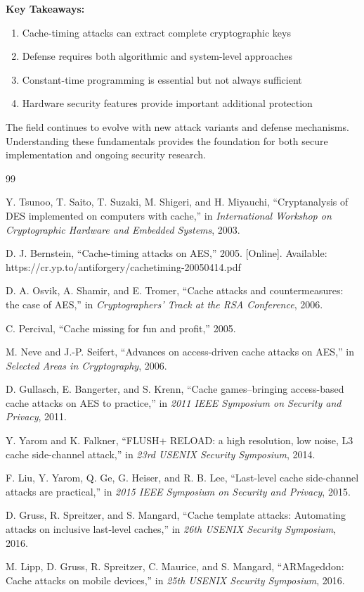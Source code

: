 \documentclass[11pt,a4paper]{article}
\theoremstyle{definition}
\begin{document}
\textbf{Key Takeaways:}
\begin{enumerate}
    \item Cache-timing attacks can extract complete cryptographic keys
    \item Defense requires both algorithmic and system-level approaches
    \item Constant-time programming is essential but not always sufficient
    \item Hardware security features provide important additional protection
\end{enumerate}

The field continues to evolve with new attack variants and defense mechanisms. Understanding these fundamentals provides the foundation for both secure implementation and ongoing security research.

\newpage

\begin{thebibliography}{99}

Y. Tsunoo, T. Saito, T. Suzaki, M. Shigeri, and H. Miyauchi, ``Cryptanalysis of DES implemented on computers with cache,'' in \textit{International Workshop on Cryptographic Hardware and Embedded Systems}, 2003.

D. J. Bernstein, ``Cache-timing attacks on AES,'' 2005. [Online]. Available: https://cr.yp.to/antiforgery/cachetiming-20050414.pdf

D. A. Osvik, A. Shamir, and E. Tromer, ``Cache attacks and countermeasures: the case of AES,'' in \textit{Cryptographers' Track at the RSA Conference}, 2006.

C. Percival, ``Cache missing for fun and profit,'' 2005.

M. Neve and J.-P. Seifert, ``Advances on access-driven cache attacks on AES,'' in \textit{Selected Areas in Cryptography}, 2006.

D. Gullasch, E. Bangerter, and S. Krenn, ``Cache games--bringing access-based cache attacks on AES to practice,'' in \textit{2011 IEEE Symposium on Security and Privacy}, 2011.

Y. Yarom and K. Falkner, ``FLUSH+ RELOAD: a high resolution, low noise, L3 cache side-channel attack,'' in \textit{23rd USENIX Security Symposium}, 2014.

F. Liu, Y. Yarom, Q. Ge, G. Heiser, and R. B. Lee, ``Last-level cache side-channel attacks are practical,'' in \textit{2015 IEEE Symposium on Security and Privacy}, 2015.

D. Gruss, R. Spreitzer, and S. Mangard, ``Cache template attacks: Automating attacks on inclusive last-level caches,'' in \textit{26th USENIX Security Symposium}, 2016.

M. Lipp, D. Gruss, R. Spreitzer, C. Maurice, and S. Mangard, ``ARMageddon: Cache attacks on mobile devices,'' in \textit{25th USENIX Security Symposium}, 2016.

\end{thebibliography}
\end{document}
